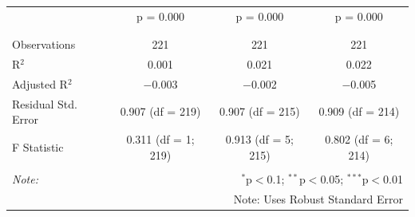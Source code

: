 \documentclass[
]{article}
\begin{document}
\begin{table}[!htbp]
\begin{tabular}{@{\extracolsep{3pt}}lccc}
  & p = 0.000 & p = 0.000 & p = 0.000 \\ 
  & & & \\ 
\hline \\[-1.8ex] 
Observations & 221 & 221 & 221 \\ 
R$^{2}$ & 0.001 & 0.021 & 0.022 \\ 
Adjusted R$^{2}$ & $-$0.003 & $-$0.002 & $-$0.005 \\ 
Residual Std. Error & 0.907 (df = 219) & 0.907 (df = 215) & 0.909 (df = 214) \\ 
F Statistic & 0.311 (df = 1; 219) & 0.913 (df = 5; 215) & 0.802 (df = 6; 214) \\ 
\hline 
\hline \\[-1.8ex] 
\textit{Note:}  & \multicolumn{3}{r}{$^{*}$p$<$0.1; $^{**}$p$<$0.05; $^{***}$p$<$0.01} \\ 
 & \multicolumn{3}{r}{Note: Uses Robust Standard Error} \\ 
\end{tabular} 
\end{table}

\clearpage
\end{document}
